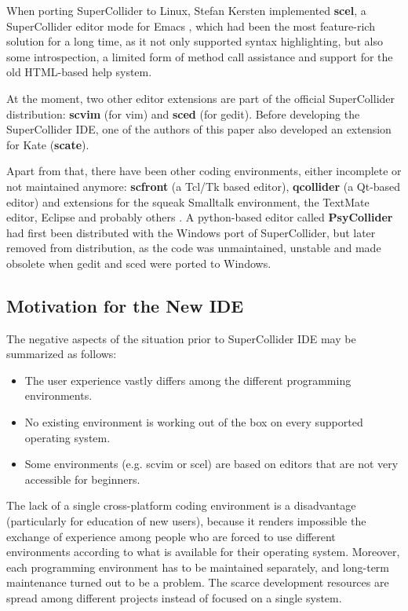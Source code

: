 \documentclass[11pt,a4paper]{article}
\begin{document}
When porting SuperCollider to Linux, Stefan Kersten implemented \textbf{scel}, a SuperCollider editor mode for Emacs
\cite{collision}, which had been the most feature-rich solution for a long time, as it not only supported syntax
highlighting, but also some introspection, a limited form of method call assistance and support for the old HTML-based
help system.

At the moment, two other editor extensions are part of the official SuperCollider distribution: \textbf{scvim} (for vim)
and \textbf{sced} (for gedit). Before developing the SuperCollider IDE, one of the authors of this paper also developed
an extension for Kate (\textbf{scate}).

Apart from that, there have been other coding environments, either incomplete or not maintained anymore:
\textbf{scfront} (a Tcl/Tk based editor), \textbf{qcollider} (a Qt-based editor) and extensions for the squeak Smalltalk
environment, the TextMate editor, Eclipse and probably others \cite{collision}. A python-based editor called
\textbf{PsyCollider} \cite{dos} had first been distributed with the Windows port of SuperCollider, but later removed
from distribution, as the code was unmaintained, unstable and made obsolete when gedit and sced were ported to
Windows.

\subsection{Motivation for the New IDE}

The negative aspects of the situation prior to SuperCollider IDE may be summarized as follows:

\begin{itemize}
\item The user experience vastly differs among the different programming environments.
\item No existing environment is working out of the box on every supported operating system.
\item Some environments (e.g. scvim or scel) are based on editors that are not very accessible for beginners.
\end{itemize}

The lack of a single cross-platform coding environment is a disadvantage (particularly for education of new users),
because it renders impossible the exchange of experience among people who are forced to use different environments
according to what is available for their operating system. Moreover, each programming environment has to be maintained
separately, and long-term maintenance turned out to be a problem. The scarce development resources are spread among
different projects instead of focused on a single system.
\end{document}
